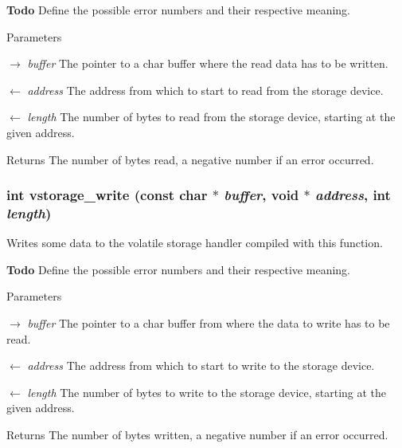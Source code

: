 \begin{Desc}
\item[{\bf Todo}]Define the possible error numbers and their respective meaning.\end{Desc}

\begin{DoxyParams}{Parameters}
\item[\mbox{$\rightarrow$} {\em buffer}]The pointer to a char buffer where the read data has to be written. \item[\mbox{$\leftarrow$} {\em address}]The address from which to start to read from the storage device. \item[\mbox{$\leftarrow$} {\em length}]The number of bytes to read from the storage device, starting at the given address.\end{DoxyParams}
\begin{DoxyReturn}{Returns}
The number of bytes read, a negative number if an error occurred. 
\end{DoxyReturn}
\subsubsection[{vstorage\_\-write}]{\setlength{\rightskip}{0pt plus 5cm}int vstorage\_\-write (const char $\ast$ {\em buffer}, \/  void $\ast$ {\em address}, \/  int {\em length})}\label{d2/dc4/volatile_8h_acdf6b24f662a99d642769d4c12473dc8}
Writes some data to the volatile storage handler compiled with this function.

\begin{Desc}
\item[{\bf Todo}]Define the possible error numbers and their respective meaning.\end{Desc}

\begin{DoxyParams}{Parameters}
\item[\mbox{$\rightarrow$} {\em buffer}]The pointer to a char buffer from where the data to write has to be read. \item[\mbox{$\leftarrow$} {\em address}]The address from which to start to write to the storage device. \item[\mbox{$\leftarrow$} {\em length}]The number of bytes to write to the storage device, starting at the given address.\end{DoxyParams}
\begin{DoxyReturn}{Returns}
The number of bytes written, a negative number if an error occurred. 
\end{DoxyReturn}
